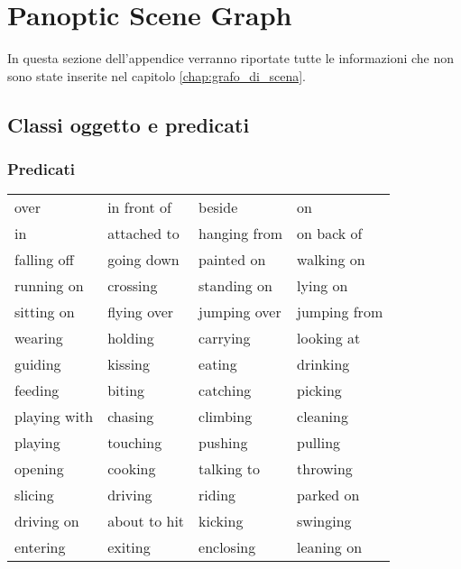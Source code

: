 \chapter{Panoptic Scene Graph}
In questa sezione dell'appendice verranno riportate tutte le informazioni che non sono state inserite nel capitolo \ref{chap:grafo_di_scena}.\\

\section{Classi oggetto e predicati}

\subsection{Predicati}\label{appendix:psgtr-predicates}
\begin{center}
  \begin{supertabular}{|l|l|l|l|}
    \hline
    over & in front of & beside & on \\
    in & attached to & hanging from & on back of \\
    falling off & going down & painted on & walking on \\
    running on & crossing & standing on & lying on \\
    sitting on & flying over & jumping over & jumping from \\
    wearing & holding & carrying & looking at \\
    guiding & kissing & eating & drinking \\
    feeding & biting & catching & picking \\
    playing with & chasing & climbing & cleaning \\
    playing & touching & pushing & pulling \\
    opening & cooking & talking to & throwing \\
    slicing & driving & riding & parked on \\
    driving on & about to hit & kicking & swinging \\
    entering & exiting & enclosing & leaning on \\
    \hline
  \end{supertabular}
\end{center}


